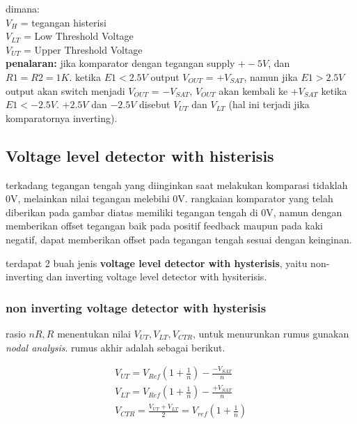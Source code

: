 dimana:\\ 
$V_H$ = tegangan histerisi\\
$V_{LT}$ = Low Threshold Voltage\\
$V_{UT}$ = Upper Threshold Voltage\\


\textbf{penalaran: } jika komparator dengan tegangan supply $+- 5V$, dan $R1=R2=1K$. ketika $E1 < 2.5V$ output
$V_{OUT}$ = $+V_{SAT}$, namun jika $E1 > 2.5V$ output akan switch menjadi $V_{OUT}$ = $-V_{SAT}$, $V_{OUT}$ akan kembali 
ke $+V_{SAT}$ ketika $E1 < -2.5V$. $+2.5V$ dan $-2.5V$ disebut $V_{UT}$ dan $V_{LT}$ (hal ini terjadi jika komparatornya inverting).



\pagebreak


\subsection{Voltage level detector with histerisis}
terkadang tegangan tengah yang diinginkan saat melakukan komparasi tidaklah 0V, melainkan nilai tegangan melebihi 0V.
rangkaian komparator yang telah diberikan pada gambar diatas memiliki tegangan tengah di 0V, namun dengan memberikan 
offset tegangan baik pada positif feedback maupun pada kaki negatif, dapat memberikan offset pada tegangan tengah 
sesuai dengan keinginan.

terdapat 2 buah jenis \textbf{ voltage level detector with hysterisis}, yaitu non-inverting dan inverting 
voltage level detector with hysiterisis.


\subsubsection{non inverting voltage detector with hysterisis}

rasio $nR, R$ menentukan nilai $V_{UT}, V_{LT}, V_{CTR}$, untuk menurunkan rumus gunakan \textit{nodal analysis}. rumus akhir
adalah sebagai berikut.

\begin{gather}
  V_{UT} = V_{Ref}(1 + \frac{1}{n}) - \frac{-V_{SAT}}{n}\\
  V_{LT} = V_{Ref}(1 + \frac{1}{n}) - \frac{+V_{SAT}}{n}\\
  V_{CTR}= \frac{V_{UT} + V_{LT}}{2} = V_{ref}(1 + \frac{1}{n})
\end{gather}

